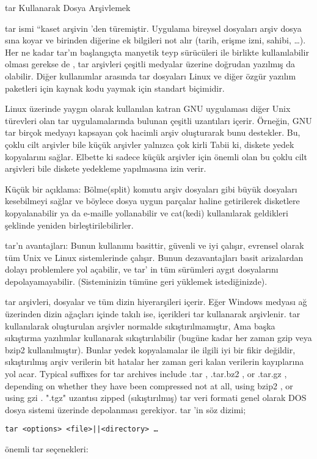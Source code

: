 \documentclass[10pt,a5paper]{book}
\begin{document}
\begin{section}{tar Kullanarak Dosya Arşivlemek}

tar ismi “kaset arşivin ’den türemiştir. Uygulama bireysel dosyaları arşiv dosya sına koyar ve birinden diğerine ek bilgileri not alır (tarih, erişme izni, sahibi, …). Her ne kadar tar’ın başlangıçta manyetik teyp sürücüleri ile birlikte kullanılabilir olması gerekse de , tar arşivleri çeşitli medyalar üzerine doğrudan yazılmış da olabilir. Diğer kullanımlar arasında tar dosyaları Linux ve diğer özgür yazılım paketleri için kaynak kodu yaymak için standart biçimidir.

Linux üzerinde yaygın olarak kullanılan katran GNU uygulaması diğer Unix türevleri olan tar uygulamalarında bulunan çeşitli uzantıları içerir. Örneğin, GNU tar birçok medyayı kapsayan çok hacimli arşiv oluşturarak bunu destekler. Bu, çoklu cilt arşivler bile küçük arşivler yalnızca çok kirli Tabii ki, diskete yedek kopyalarını sağlar. Elbette ki sadece küçük arşivler için önemli olan bu çoklu cilt arşivleri bile diskete yedekleme yapılmasına izin verir.

Küçük bir açıklama: Bölme(split) komutu arşiv dosyaları gibi büyük dosyaları kesebilmeyi sağlar ve böylece dosya uygun parçalar haline getirilerek disketlere kopyalanabilir ya da e-maille yollanabilir ve cat(kedi) kullanılarak geldikleri şeklinde yeniden birleştirilebilirler.

tar’n avantajları: Bunun kullanımı basittir, güvenli ve iyi çalışır, evrensel olarak tüm Unix ve Linux sistemlerinde çalışır. Bunun dezavantajları basit arizalardan dolayı problemlere yol açabilir, ve  tar’ in tüm sürümleri aygıt dosyalarını depolayamayabilir. (Sisteminizin tümüne geri yüklemek istediğinizde).

tar arşivleri, dosyalar ve tüm dizin hiyerarşileri içerir. Eğer Windows medyası ağ üzerinden dizin ağaçları içinde takılı ise, içerikleri tar kullanarak arşivlenir. tar kullanılarak oluşturulan arşivler normalde sıkıştırılmamıştır, Ama başka sıkıştırma yazılımlar kullanarak sıkıştırılabilir (bugüne kadar her zaman gzip veya bzip2 kullanılmıştır). Bunlar yedek kopyalamalar ile ilgili iyi bir fikir değildir, sıkıştırılmış arşiv verilerin bit hatalar her zaman geri kalan verilerin kayıplarına yol acar. Typical suffixes for tar archives include .tar , .tar.bz2 , or .tar.gz , depending on whether they have been compressed not at all, using bzip2 , or using gzi . ".tgz" uzantısı zipped (sıkıştırılmış) tar veri formati genel olarak DOS dosya sistemi üzerinde depolanması gerekiyor. tar ’in söz dizimi;
\begin{verbatim}
tar <options> <file>||<directory> …
\end{verbatim}
önemli tar seçenekleri:


\end{section}
\end{document}
